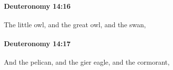 		\paragraph{Deuteronomy 14:16} %
			\label{DEUTERONOMY-14-16}

			The little owl, and the great owl, and the swan,


		\paragraph{Deuteronomy 14:17} %
			\label{DEUTERONOMY-14-17}

			And the pelican, and the gier eagle, and the cormorant,


